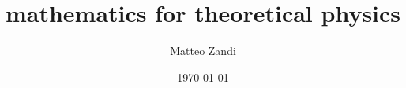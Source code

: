\documentclass[a4paper, 12pt]{memoir}
\title{mathematics for theoretical physics}
\author{Matteo Zandi}
\date{\today}
\begin{document}
\frontmatter



\tableofcontents

\mainmatter



\backmatter

\nocite{ortolani}
\nocite{schuller}

\clearpage
{}
\printbibliography
\end{document}
